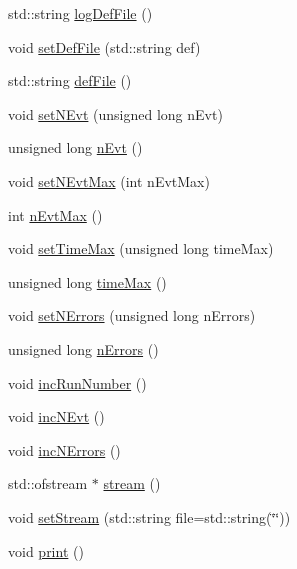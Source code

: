 \begin{DoxyCompactItemize}
\item 
std::string \hyperlink{classOptions_a5d362ec7f7969bd72c3c94b8e3d5ba97}{logDefFile} ()
\item 
void \hyperlink{classOptions_a3c8bed9867ac5805489d78061e55bd1a}{setDefFile} (std::string def)
\item 
std::string \hyperlink{classOptions_aca5ce5262ca717eaad5ff9db92ad1948}{defFile} ()
\item 
void \hyperlink{classOptions_ae6a0fdaa736948f5040deb3eb6889268}{setNEvt} (unsigned long nEvt)
\item 
unsigned long \hyperlink{classOptions_ad769b256263a4ac24dd6f989ae724ab7}{nEvt} ()
\item 
void \hyperlink{classOptions_a6d732c0591188469287581bac8a4e3cd}{setNEvtMax} (int nEvtMax)
\item 
int \hyperlink{classOptions_ad1f3b03d734c806a2feca418b26bcc9b}{nEvtMax} ()
\item 
void \hyperlink{classOptions_aaa921f68319ea83b5c5a13e37a831c7a}{setTimeMax} (unsigned long timeMax)
\item 
unsigned long \hyperlink{classOptions_a4569b8790af48109c8639bec7b626fa6}{timeMax} ()
\item 
void \hyperlink{classOptions_a45368b495036869c67fe0e6bf9abc4e6}{setNErrors} (unsigned long nErrors)
\item 
unsigned long \hyperlink{classOptions_acc6474323f0bbe17fa844e9a086b90b8}{nErrors} ()
\item 
void \hyperlink{classOptions_a0bf512fc9126cd76acabaa4c3b65d7fb}{incRunNumber} ()
\item 
void \hyperlink{classOptions_aa950f9861182c76c4005668e0b7f012a}{incNEvt} ()
\item 
void \hyperlink{classOptions_ae5d12fb2571255033ef6b35300921b39}{incNErrors} ()
\item 
std::ofstream $\ast$ \hyperlink{classOptions_acfc9aa4c7dc41691571f2b37d3fe86af}{stream} ()
\item 
void \hyperlink{classOptions_af7df7a64e597f0bed79ca979f8144daa}{setStream} (std::string file=std::string(\char`\"{}\char`\"{}))
\item 
void \hyperlink{classOptions_a3f4593f64bc8c8afc3ade9237adb83e1}{print} ()
\end{DoxyCompactItemize}
